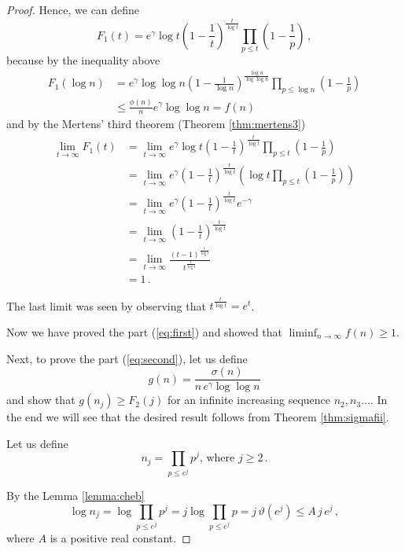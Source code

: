 \documentclass{article}
\begin{document}
\begin{theorem}
\begin{proof}
Hence, we can define
\begin{equation*}
    F_1(t)=e^\gamma \log t \left(1-\frac{1}{t}\right)^\frac{t}{\log t} \prod_{p\leq t} \left(1-\frac{1}{p}\right)\,,
\end{equation*}
because by the inequality above
\begin{align*}
    F_1(\log n) & = e^\gamma \log \log n \left(1-\frac{1}{\log n}\right)^\frac{\log n}{\log \log n} \prod_{p\leq \log n} \left(1-\frac{1}{p}\right)\\
    & \leq \frac{\phi(n)}{n} e^\gamma \log\log n = f(n)
\end{align*}
and by the Mertens' third theorem (Theorem \ref{thm:mertens3})
\begin{align*}
    \lim_{t \rightarrow \infty} F_1(t) & = \lim_{t \rightarrow \infty} e^\gamma \log t \left(1-\frac{1}{t}\right)^\frac{t}{\log t} \prod_{p\leq t} \left(1-\frac{1}{p}\right)\\
    & = \lim_{t \rightarrow \infty} e^\gamma \left( 1-\frac{1}{t}\right)^\frac{t}{\log t} \left(\log t \prod_{p\leq t} \left(1-\frac{1}{p}\right) \right)\\
    & = \lim_{t \rightarrow \infty} e^\gamma \left( 1-\frac{1}{t}\right)^\frac{t}{\log t} e^{-\gamma}\\
    & = \lim_{t \rightarrow \infty} \left( 1-\frac{1}{t}\right)^\frac{t}{\log t}\\
    & = \lim_{t \rightarrow \infty} \frac{(t-1)^\frac{t}{\log t}}{t^\frac{t}{\log t}}\\
    & = 1\,.
\end{align*}

The last limit was seen by observing that $t^{\frac{t}{\log t}} = e^t$.

Now we have proved the part (\ref{eq:first}) and showed that
$\liminf_{n \rightarrow \infty}{f(n)}\geq 1$.

Next, to prove the part (\ref{eq:second}), let us define
\begin{equation*}
    g(n)=\frac{\sigma(n)}{n\,e^\gamma \log\log n}
\end{equation*}
and show that $g(n_j) \geq F_2(j)$ for an infinite increasing sequence $n_2,n_3\dots$. In the end we will see that the desired result follows from Theorem \ref{thm:sigmafii}.

Let us define
\begin{equation*}
    n_j=\prod_{p\leq e^j} p^j\text{, where } j\geq 2\,.
\end{equation*}

By the Lemma \ref{lemma:cheb}
\begin{equation*}
    \log n_j = \log \prod_{p\leq e^j} p^j = j \log \prod_{p\leq e^j} p = j\,\vartheta(e^j) \leq A\,j\,e^j\,,
\end{equation*}
where $A$ is a positive real constant.


\end{proof}
\end{theorem}
\end{document}
